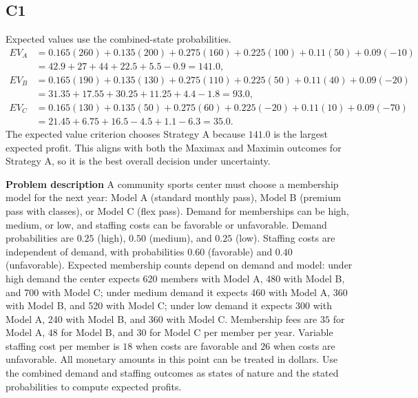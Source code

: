 \begin{ExamProblems}
		\subsection*{C1}
		Expected values use the combined-state probabilities.
		\[
		\begin{aligned}
		EV_A &= 0.165(260)+0.135(200)+0.275(160)+0.225(100)+0.11(50)+0.09(-10)\\
		&= 42.9+27+44+22.5+5.5-0.9=141.0,\\
		EV_B &= 0.165(190)+0.135(130)+0.275(110)+0.225(50)+0.11(40)+0.09(-20)\\
		&= 31.35+17.55+30.25+11.25+4.4-1.8=93.0,\\
		EV_C &= 0.165(130)+0.135(50)+0.275(60)+0.225(-20)+0.11(10)+0.09(-70)\\
		&= 21.45+6.75+16.5-4.5+1.1-6.3=35.0.
		\end{aligned}
		\]
		The expected value criterion chooses Strategy A because $141.0$ is the largest expected profit. This aligns with both the Maximax and Maximin outcomes for Strategy A, so it is the best overall decision under uncertainty.

		\item
		\textbf{Problem description}
		A community sports center must choose a membership model for the next year: Model A (standard monthly pass),
		Model B (premium pass with classes), or Model C (flex pass). Demand for memberships can be high, medium, or low, and staffing costs can be favorable or unfavorable. Demand probabilities are $0.25$ (high), $0.50$ (medium), and $0.25$ (low). Staffing costs are independent of demand, with probabilities $0.60$ (favorable) and $0.40$ (unfavorable). Expected membership counts depend on demand and model: under high demand the center expects 620 members with Model A, 480 with Model B, and 700 with Model C; under medium demand it expects 460 with Model A, 360 with Model B, and 520 with Model C; under low demand it expects 300 with Model A, 240 with Model B, and 360 with Model C. Membership fees are $35$ for Model A, $48$ for Model B, and $30$ for Model C per member per year. Variable staffing cost per member is $18$ when costs are favorable and $26$ when costs are unfavorable. All monetary amounts in this point can be treated in dollars. Use the combined demand and staffing outcomes as states of nature and the stated probabilities to compute expected profits.


\end{ExamProblems}
